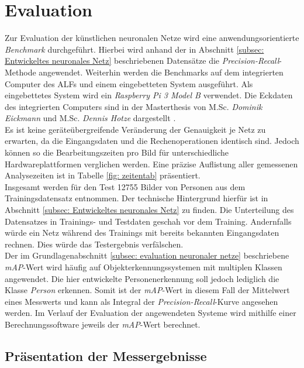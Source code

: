 \chapter{Evaluation}
\label{ch: Verifikation}
Zur Evaluation der künstlichen neuronalen Netze wird eine anwendungsorientierte \textit{Benchmark} durchgeführt. Hierbei wird anhand der in Abschnitt \ref{subsec: Entwickeltes neuronales Netz} beschriebenen Datensätze die \textit{Precision-Recall}-Methode angewendet. Weiterhin werden die Benchmarks auf dem integrierten Computer des ALFs und einem eingebetteten System ausgeführt. Als eingebettetes System wird ein \textit{Raspberry Pi 3 Model B} verwendet. Die Eckdaten des integrierten Computers sind in der Masterthesis von M.Sc. \textit{Dominik Eickmann} und M.Sc. \textit{Dennis Hotze} dargestellt \cite{alf}.\\

Es ist keine geräteübergreifende Veränderung der Genauigkeit je Netz zu erwarten, da die Eingangsdaten und die Rechenoperationen identisch sind. Jedoch können so die Bearbeitungszeiten pro Bild für unterschiedliche Hardwareplattformen verglichen werden. Eine präzise Auflistung aller gemessenen Analysezeiten ist in Tabelle \ref{fig: zeitentab} präsentiert. \\

Insgesamt werden für den Test 12755 Bilder von Personen aus dem Trainingsdatensatz entnommen. Der technische Hintergrund hierfür ist in Abschnitt \ref{subsec: Entwickeltes neuronales Netz} zu finden. Die Unterteilung des Datensatzes in Trainings- und Testdaten geschah vor dem Training. Andernfalls würde ein Netz während des Trainings mit bereits bekannten Eingangsdaten rechnen. Dies würde das Testergebnis verfälschen.\\
 

Der im Grundlagenabschnitt \ref{subsec: evaluation neuronaler netze} beschriebene \textit{mAP}-Wert wird häufig auf Objekterkennungssystemen mit multiplen Klassen angewendet. Die hier entwickelte Personenerkennung soll jedoch lediglich die Klasse \textit{Person} erkennen. Somit ist der \textit{mAP}-Wert in diesem Fall der Mittelwert eines Messwerts und kann als Integral der \textit{Precision-Recall}-Kurve angesehen werden. Im Verlauf der Evaluation der angewendeten Systeme wird mithilfe einer Berechnungssoftware jeweils der \textit{mAP}-Wert berechnet.
 
\section{Präsentation der Messergebnisse} 


